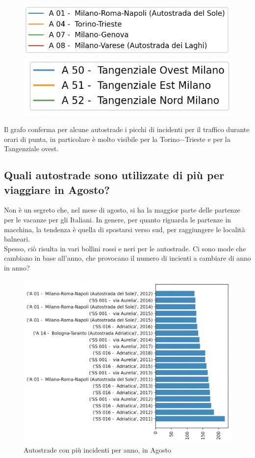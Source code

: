 \documentclass[a4paper]{report}
\begin{document}
\begin{figure}
    \includegraphics[width=0.6\linewidth]{../src/incidenti/incidenti_aci/autostrade/legenda_autostrade.png}
    \label{fig:legenda_autostrade}
    \includegraphics[width=0.5\linewidth]{../src/incidenti/incidenti_aci/autostrade/legenda_tangenziali.png}
    \label{fig:legenda_tangenziali}
\end{figure}

Il grafo conferma per alcune autostrade i picchi di incidenti per il traffico durante orari 
di punta, in particolare è molto visibile per la Torino$-$Trieste e per la Tangenziale ovest.


\subsection{Quali autostrade sono utilizzate di più per viaggiare in Agosto?}

Non è un segreto che, nel mese di agosto, si ha la maggior parte delle partenze per le vacanze per 
gli Italiani. In genere, per quanto riguarda le partenze in macchina, la tendenza è quella di spostarsi verso sud, 
per raggiungere le località balneari.\\
Spesso, ciò risulta in vari bollini rossi e neri per le autostrade. 
Ci sono mode che cambiano in base all'anno, 
che provocano il numero di incienti a cambiare di anno in anno? 

\begin{figure}
    \includegraphics[width=\linewidth]{../src/incidenti/incidenti_aci/agosto/autostrade_anno_agosto.png}
    \caption{Autostrade con più incidenti per anno, in Agosto}
    \label{fig:autostrade_anno_agosto}
\end{figure}
\end{document}
